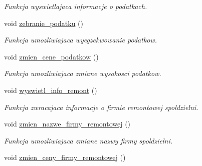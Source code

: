 \begin{DoxyCompactItemize}
\begin{DoxyCompactList}\small\item\em Funkcja wyswietlajaca informacje o podatkach. \end{DoxyCompactList}\item 
\hypertarget{class_zarzadanie__wspoldzielnia_a8c74803cc1d5819e54e46c13e624d3bc}{}void \hyperlink{class_zarzadanie__wspoldzielnia_a8c74803cc1d5819e54e46c13e624d3bc}{zebranie\+\_\+podatku} ()\label{class_zarzadanie__wspoldzielnia_a8c74803cc1d5819e54e46c13e624d3bc}

\begin{DoxyCompactList}\small\item\em Funkcja umozliwiajaca wyegzekwowanie podatkow. \end{DoxyCompactList}\item 
\hypertarget{class_zarzadanie__wspoldzielnia_a79a6bd0f14276478baa8fc6811719515}{}void \hyperlink{class_zarzadanie__wspoldzielnia_a79a6bd0f14276478baa8fc6811719515}{zmien\+\_\+cene\+\_\+podatkow} ()\label{class_zarzadanie__wspoldzielnia_a79a6bd0f14276478baa8fc6811719515}

\begin{DoxyCompactList}\small\item\em Funkcja umozliwiajaca zmiane wysokosci podatkow. \end{DoxyCompactList}\item 
\hypertarget{class_zarzadanie__wspoldzielnia_a07fcd69d311fac7e1cc9dc1c34bfe65e}{}void \hyperlink{class_zarzadanie__wspoldzielnia_a07fcd69d311fac7e1cc9dc1c34bfe65e}{wyswietl\+\_\+info\+\_\+remont} ()\label{class_zarzadanie__wspoldzielnia_a07fcd69d311fac7e1cc9dc1c34bfe65e}

\begin{DoxyCompactList}\small\item\em Funkcja zwracajaca informacje o firmie remontowej spoldzielni. \end{DoxyCompactList}\item 
\hypertarget{class_zarzadanie__wspoldzielnia_ac85986ebf98ca6a13f8d163b4b100151}{}void \hyperlink{class_zarzadanie__wspoldzielnia_ac85986ebf98ca6a13f8d163b4b100151}{zmien\+\_\+nazwe\+\_\+firmy\+\_\+remontowej} ()\label{class_zarzadanie__wspoldzielnia_ac85986ebf98ca6a13f8d163b4b100151}

\begin{DoxyCompactList}\small\item\em Funkcja umozliwiajaca zmiane nazwy firmy spoldzielni. \end{DoxyCompactList}\item 
\hypertarget{class_zarzadanie__wspoldzielnia_a00b4f3b54fcb0959c7a77bbec969efea}{}void \hyperlink{class_zarzadanie__wspoldzielnia_a00b4f3b54fcb0959c7a77bbec969efea}{zmien\+\_\+ceny\+\_\+firmy\+\_\+remontowej} ()\label{class_zarzadanie__wspoldzielnia_a00b4f3b54fcb0959c7a77bbec969efea}


\end{DoxyCompactItemize}
